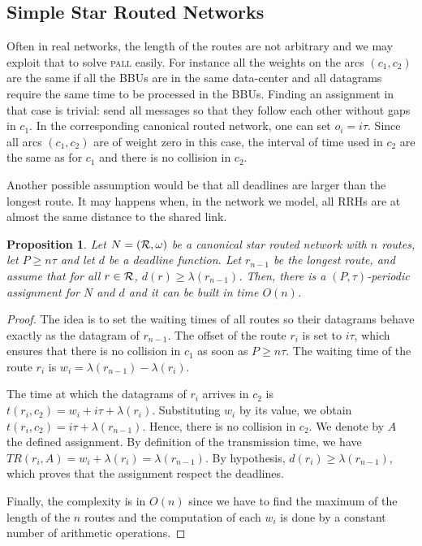\documentclass[a4paper,10pt]{article}
\newtheorem{proposition}{Proposition}
\newcommand\pall{\textsc{pall}\xspace}
\begin{document}
	\subsection{Simple Star Routed Networks}
		

	Often in real networks, the length of the routes are not arbitrary and we may exploit that to solve \pall easily. For instance all the weights on the arcs $(c_1,c_2)$ are the same if all the BBUs are in the same data-center and all datagrams require the same time to be processed in the BBUs.
Finding an assignment in that case is trivial: send all messages so that they follow each other without gaps in $c_1$. In the corresponding canonical routed network, one can set $o_i = i\tau$.  Since all arcs $(c_1,c_2)$ are of weight zero in this case, the interval of time used in $c_2$ are the same as for $c_1$ and there is no collision in $c_2$.

	Another possible assumption would be that all deadlines are larger than the longest route. It may happens when, in the network we model, all RRHs are at almost the same distance to the shared link.

	 \begin{proposition}\label{prop:asym}
	Let $N = ({\cal R}, \omega)$ be a canonical star routed network with $n$ routes, let $P \geq n\tau$ and let $d$ be a deadline function. Let $r_{n-1}$ be the longest route, and assume that for all $r\in {\cal R}$, $d(r) \geq \lambda(r_{n-1})$. Then, there is a $(P,\tau)$-periodic assignment for $N$ and $d$ and it can be built in time $O(n)$.
	 \end{proposition}
      \begin{proof}
       The idea is to set the waiting times of all routes so their datagrams behave exactly as the datagram of $r_{n-1}$. The offset of the route $r_i$ is set to $i\tau$, which ensures that there is no collision in $c_1$ as soon as $P \geq n\tau$. The waiting time of the route $r_i$ is $w_i = \lambda(r_{n-1}) - \lambda(r_{i})$.
        
    The time at which the datagrams of $r_i$ arrives in $c_2$ is $t(r_i, c_2) = w_i + i\tau + \lambda(r_{i})$. Substituting $w_i$ by its value, we obtain $t(r_i, c_2) =  i\tau + \lambda(r_{n-1})$.
    Hence, there is no collision in $c_2$. We denote by $A$ the defined assignment. By definition of the transmission time, we have $TR(r_i,A) = w_i + \lambda(r_i) = \lambda(r_{n-1})$. By hypothesis, $d(r_i) \geq \lambda(r_{n-1})$, which proves that the assignment respect the deadlines.

	Finally, the complexity is in $O(n)$ since we have to find the maximum of the length of the $n$ routes and the computation of each $w_i$ is done by a constant number of arithmetic operations.
     \end{proof}
     
\end{document}
